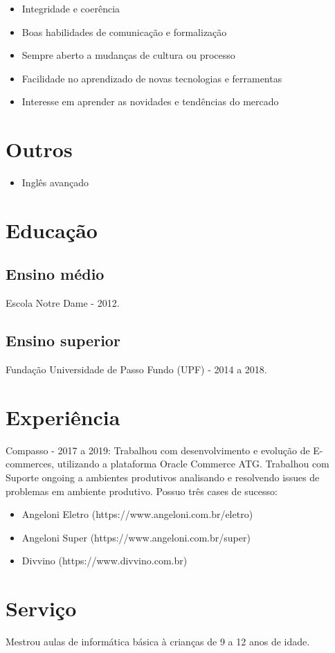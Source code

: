 \documentclass{article}
\begin{document}
\begin{itemize}
\item Integridade e coerência
\item Boas habilidades de comunicação e formalização
\item Sempre aberto a mudanças de cultura ou processo
\item Facilidade no aprendizado de novas tecnologias e ferramentas
\item Interesse em aprender as novidades e tendências do mercado
\end{itemize} 

\section{Outros}

\begin{itemize}
\item Inglês avançado
\end{itemize}

\section{Educação}

\subsection{Ensino médio}

Escola Notre Dame - 2012.

\subsection{Ensino superior}

Fundação Universidade de Passo Fundo (UPF) - 2014 a 2018.

\section{Experiência}

Compasso - 2017 a 2019:
\newline \newline
Trabalhou com desenvolvimento e evolução de E-commerces, utilizando a plataforma Oracle Commerce ATG.
\newline \newline
Trabalhou com Suporte ongoing a ambientes produtivos analisando e resolvendo issues de problemas em ambiente produtivo.
\newline \newline
Possuo três cases de sucesso:
\begin{itemize}
\item Angeloni Eletro (https://www.angeloni.com.br/eletro)
\item Angeloni Super (https://www.angeloni.com.br/super)
\item Divvino (https://www.divvino.com.br)
\end{itemize}

\section{Serviço}

Mestrou aulas de informática básica à crianças de 9 a 12 anos de idade.
\end{document}
